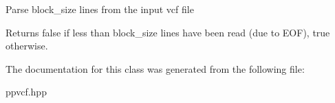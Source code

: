 Parse block\+\_\+size lines from the input vcf file

\begin{DoxyReturn}{Returns}
false if less than block\+\_\+size lines have been read (due to E\+OF), true otherwise. 
\end{DoxyReturn}


The documentation for this class was generated from the following file\+:\begin{DoxyCompactItemize}
\item 
ppvcf.\+hpp\end{DoxyCompactItemize}
